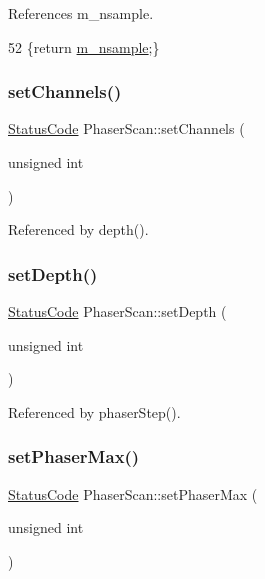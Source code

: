References m\+\_\+nsample.


\begin{DoxyCode}
52 \{\textcolor{keywordflow}{return} \hyperlink{classPhaserScan_a6c2089bb98fa8a897430b17ddb052447}{m\_nsample};\}
\end{DoxyCode}
\mbox{\label{classPhaserScan_a12fc9ff050fc15e067ae622c37827661}} 
\subsubsection{\texorpdfstring{set\+Channels()}{setChannels()}}
{\footnotesize\ttfamily \hyperlink{classStatusCode}{Status\+Code} Phaser\+Scan\+::set\+Channels (\begin{DoxyParamCaption}\item[{unsigned}]{int }\end{DoxyParamCaption})}



Referenced by depth().

\mbox{\label{classPhaserScan_a182d5a23019a62c3c3ad3a03f5187036}} 
\subsubsection{\texorpdfstring{set\+Depth()}{setDepth()}}
{\footnotesize\ttfamily \hyperlink{classStatusCode}{Status\+Code} Phaser\+Scan\+::set\+Depth (\begin{DoxyParamCaption}\item[{unsigned}]{int }\end{DoxyParamCaption})}



Referenced by phaser\+Step().

\mbox{\label{classPhaserScan_ad968ae47c77c7813caf69cc22ff40559}} 
\subsubsection{\texorpdfstring{set\+Phaser\+Max()}{setPhaserMax()}}
{\footnotesize\ttfamily \hyperlink{classStatusCode}{Status\+Code} Phaser\+Scan\+::set\+Phaser\+Max (\begin{DoxyParamCaption}\item[{unsigned}]{int }\end{DoxyParamCaption})}



